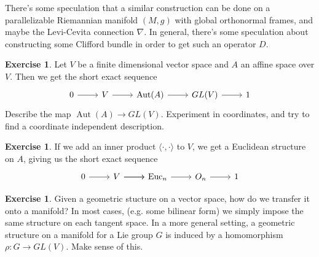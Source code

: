 \documentclass[psamsfonts]{amsart}
\theoremstyle{definition}
\newtheorem{exer}[thm]{Exercise}
\theoremstyle{remark}
\DeclareMathOperator{\Aut}{Aut}
\begin{document}
There's some speculation that a similar construction can be done on a parallelizable Riemannian manifold $(M,g)$ with global orthonormal frames, and maybe the Levi-Cevita connection $\nabla$. In general, there's some speculation about constructing some Clifford bundle in order to get such an operator $D$.
%
\begin{exer}
Let $V$ be a finite dimensional vector space and $A$ an affine space over $V$. Then we get the short exact sequence
$$\begin{tikzcd}
0 \ar[r] & V \ar[r] & \Aut(A) \ar[r] & GL(V) \ar[r] & 1
\end{tikzcd}$$
Describe the map $\Aut(A) \to GL(V)$. Experiment in coordinates, and try to find a coordinate independent description.
\end{exer}
%
\begin{exer}
If we add an inner product $\langle \cdot,\cdot \rangle$ to $V$, we get a Euclidean structure on $A$, giving us the short exact sequence
$$ \begin{tikzcd}
0 \ar[r] & \ar[r] V \ar[r] & \mathrm{Euc}_n \ar[r] & O_n \ar[r] & 1 
\end{tikzcd}$$
\end{exer}
%
\begin{exer}
Given a geometric stucture on a vector space, how do we transfer it onto a manifold? In most cases, (e.g. some bilinear form) we simply impose the same structure on each tangent space. In a more general setting, a geometric structure on a manifold for a Lie group $G$ is induced by a homomorphism $\rho : G \to GL(V)$. Make sense of this.
\end{exer}
%
\end{document}
